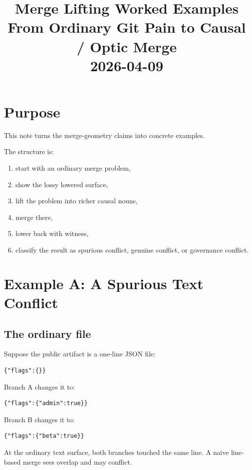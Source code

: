 \documentclass[11pt]{article}
\title{Merge Lifting Worked Examples\\[6pt]
\large From Ordinary Git Pain to Causal / Optic Merge\\[3pt]
\normalsize 2026-04-09}
\author{}
\date{}
\theoremstyle{definition}
\begin{document}
\maketitle

\section{Purpose}

This note turns the merge-geometry claims into concrete examples.

The structure is:
\begin{enumerate}[leftmargin=2em]
\item start with an ordinary merge problem,
\item show the lossy lowered surface,
\item lift the problem into richer causal nouns,
\item merge there,
\item lower back with witness,
\item classify the result as spurious conflict, genuine conflict, or governance
  conflict.
\end{enumerate}

\section{Example A: A Spurious Text Conflict}

\subsection{The ordinary file}

Suppose the public artifact is a one-line JSON file:

\begin{verbatim}
{"flags":{}}
\end{verbatim}

Branch A changes it to:

\begin{verbatim}
{"flags":{"admin":true}}
\end{verbatim}

Branch B changes it to:

\begin{verbatim}
{"flags":{"beta":true}}
\end{verbatim}

At the ordinary text surface, both branches touched the same line. A naive
line-based merge sees overlap and may conflict.
\end{document}
